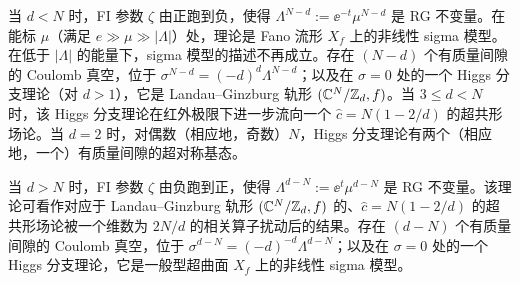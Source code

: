 当 $d<N$ 时，FI 参数 $\zeta$ 由正跑到负，使得 $\Lambda^{N-d}:=\ee^{-t}\mu^{N-d}$ 是 RG 不变量。在能标 $\mu$（满足 $e\gg\mu\gg|\Lambda|$）处，理论是 Fano 流形 $X_f$ 上的非线性 sigma 模型。在低于 $|\Lambda|$ 的能量下，sigma 模型的描述不再成立。存在 $(N-d)$ 个有质量间隙的 Coulomb 真空，位于 $\sigma^{N-d}=(-d)^d\Lambda^{N-d}$；以及在 $\sigma=0$ 处的一个 Higgs 分支理论（对 $d>1$），它是 Landau--Ginzburg 轨形 $(\mathbb{C}^N/\mathbb{Z}_d,f)$。当 $3\le d<N$ 时，该 Higgs 分支理论在红外极限下进一步流向一个 $\hat c=N(1-2/d)$ 的超共形场论。当 $d=2$ 时，对偶数（相应地，奇数）$N$，Higgs 分支理论有两个（相应地，一个）有质量间隙的超对称基态。

当 $d>N$ 时，FI 参数 $\zeta$ 由负跑到正，使得 $\Lambda^{d-N}:=\ee^{t}\mu^{d-N}$ 是 RG 不变量。该理论可看作对应于 Landau--Ginzburg 轨形 $(\mathbb{C}^N/\mathbb{Z}_d,f)$ 的、$\hat c=N(1-2/d)$ 的超共形场论被一个维数为 $2N/d$ 的相关算子扰动后的结果。存在 $(d-N)$ 个有质量间隙的 Coulomb 真空，位于 $\sigma^{d-N}=(-d)^{-d}\Lambda^{d-N}$；以及在 $\sigma=0$ 处的一个 Higgs 分支理论，它是一般型超曲面 $X_f$ 上的非线性 sigma 模型。
